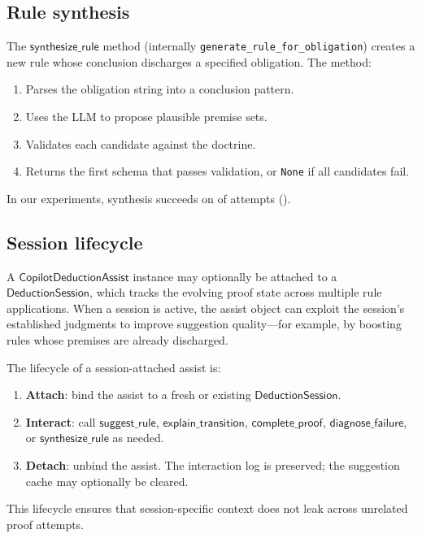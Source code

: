 \documentclass[11pt]{article}
\newcommand{\CDA}{\ensuremath{\mathsf{CopilotDeductionAssist}}}
\newcommand{\LLM}{\textsc{LLM}}
\newcommand{\suggestRule}{\ensuremath{\mathsf{suggest\_rule}}}
\newcommand{\explainTrans}{\ensuremath{\mathsf{explain\_transition}}}
\newcommand{\completeProof}{\ensuremath{\mathsf{complete\_proof}}}
\newcommand{\diagnoseFailure}{\ensuremath{\mathsf{diagnose\_failure}}}
\newcommand{\synthesizeRule}{\ensuremath{\mathsf{synthesize\_rule}}}
\begin{document}
\subsection{Rule synthesis}\label{ssec:synthesize}

The $\synthesizeRule$ method (internally
\texttt{generate\_rule\_for\_obligation}) creates a new rule whose
conclusion discharges a specified obligation.  The method:
\begin{enumerate}
  \item Parses the obligation string into a conclusion pattern.
  \item Uses the \LLM{} to propose plausible premise sets.
  \item Validates each candidate against the doctrine.
  \item Returns the first schema that passes validation, or
    \texttt{None} if all candidates fail.
\end{enumerate}

\noindent
In our experiments, synthesis succeeds on
\ppLXXXVIIsynthesisSuccesses{} of \ppLXXXVIIsynthesisAttempts{}
attempts (\ppLXXXVIIsynthesisSuccessRate).

\subsection{Session lifecycle}\label{ssec:session}

A $\CDA$ instance may optionally be attached to a
$\mathsf{DeductionSession}$, which tracks the evolving proof state
across multiple rule applications.  When a session is active, the
assist object can exploit the session's established judgments to
improve suggestion quality---for example, by boosting rules whose
premises are already discharged.

The lifecycle of a session-attached assist is:
\begin{enumerate}
  \item \textbf{Attach}: bind the assist to a fresh or existing
    $\mathsf{DeductionSession}$.
  \item \textbf{Interact}: call $\suggestRule$, $\explainTrans$,
    $\completeProof$, $\diagnoseFailure$, or $\synthesizeRule$ as
    needed.
  \item \textbf{Detach}: unbind the assist.  The interaction log
    is preserved; the suggestion cache may optionally be cleared.
\end{enumerate}
This lifecycle ensures that session-specific context does not leak
across unrelated proof attempts.
\end{document}
